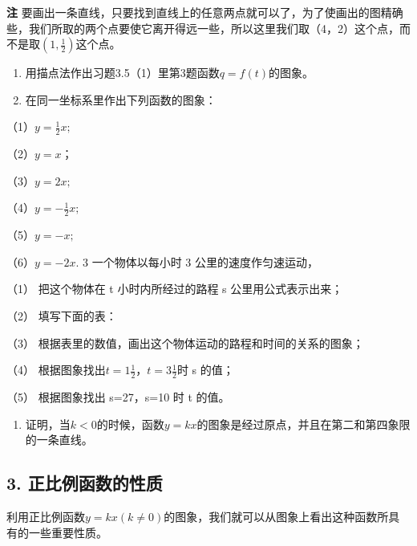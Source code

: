 \textbf{注}
要画出一条直线，只要找到直线上的任意两点就可以了，为了使画出的图精确些，我们所取的两个点要使它离开得远一些，所以这里我们取（4，2）这个点，而不是取\(\left(1, \frac{1}{2}\right)\)这个点。

\begin{enumerate}
\item
  用描点法作出习题3.5（1）里第3题函数\(q = f(t)\)的图象。
\item
  在同一坐标系里作出下列函数的图象：
\end{enumerate}

（1）\(y = \frac{1}{2} x;\)

（2）\(y = x\)；

（3）\(y = 2x;\)

（4）\(y = -\frac{1}{2} x;\)

（5）\(y = -x;\)

（6）\(y = -2x.\) 3 一个物体以每小时 3 公里的速度作匀速运动，

（1） 把这个物体在 t 小时内所经过的路程 s 公里用公式表示出来；

（2） 填写下面的表：

{\centering
\small\setlength{\tabcolsep}{3pt}%
\par
}

（3） 根据表里的数值，画出这个物体运动的路程和时间的关系的图象；

（4） 根据图象找出\(t=1\frac{1}{2}\)，\(t=3\frac{1}{2}\)时 s 的值；

（5） 根据图象找出 s=27，s=10 时 t 的值。

\begin{enumerate}[start=4,label={*\arabic*.}]
\item
  证明，当\(k < 0\)的时候，函数\(y = kx\)的图象是经过原点，并且在第二和第四象限的一条直线。

\end{enumerate}
\subsection{3. 正比例函数的性质}

利用正比例函数\(y = kx (k \neq 0)\)的图象，我们就可以从图象上看出这种函数所具有的一些重要性质。

